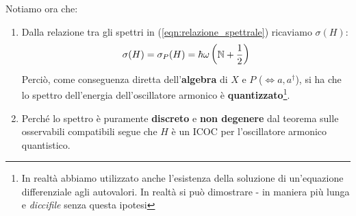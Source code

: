 \documentclass[../../FisicaTeorica.tex]{subfiles}
\begin{document}
Notiamo ora che:
\begin{enumerate}
\item Dalla relazione tra gli spettri in (\ref{eqn:relazione_spettrale}) ricaviamo $\sigma(H)$:
\begin{align*}
\sigma(H)=\sigma_P(H)=\hbar \omega\left(\mathbb{N}+\frac{1}{2}\right)
\end{align*}
Perciò, come conseguenza diretta dell'\textbf{algebra} di $X$ e $P$ ($\Leftrightarrow a, a^\dag$), si ha che lo spettro dell'energia dell'oscillatore armonico è \textbf{quantizzato}\footnote{In realtà abbiamo utilizzato anche l'esistenza della soluzione di un'equazione differenziale agli autovalori. In realtà si può dimostrare - in maniera più lunga e \textit{diccifile} senza questa ipotesi}.
\item Perché lo spettro è puramente \textbf{discreto} e \textbf{non degenere} dal teorema sulle osservabili compatibili segue che $H$ è un ICOC per l'oscillatore armonico quantistico.\\
\end{enumerate}
\end{document}

